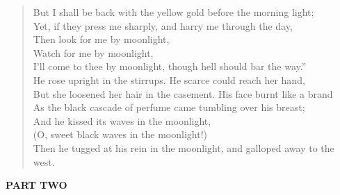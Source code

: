 \begin{verse}
But I shall be back with the yellow gold before the morning light;\\
Yet, if they press me sharply, and harry me through the day,\\
Then look for me by moonlight,\\
Watch for me by moonlight,\\
I'll come to thee by moonlight, though hell should bar the way.''\\
He rose upright in the stirrups. He scarce could reach her hand,\\
But she loosened her hair in the casement. His face burnt like a brand\\
As the black cascade of perfume came tumbling over his breast;\\
And he kissed its waves in the moonlight,\\
(O, sweet black waves in the moonlight!)\\
Then he tugged at his rein in the moonlight, and galloped away to the west.
\end{verse}

\textbf{PART TWO}


